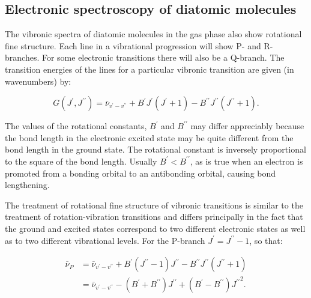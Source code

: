 \documentclass[
  9pt,
]{extbook}
\theoremstyle{definition}
\theoremstyle{definition}
\theoremstyle{definition}
\theoremstyle{remark}
\begin{document}
\hypertarget{electronic-spectroscopy-of-diatomic-molecules}{%
\subsection{Electronic spectroscopy of diatomic molecules}\label{electronic-spectroscopy-of-diatomic-molecules}}

The vibronic spectra of diatomic molecules in the gas phase also show rotational fine structure. Each line in a vibrational progression will show P- and R- branches. For some electronic transitions there will also be a Q-branch. The transition energies of the lines for a particular vibronic transition are given (in wavenumbers) by:

\begin{equation}
G(J^{\prime },J^{{\prime \prime }})={\bar  \nu }_{{v^{\prime }-v^{{\prime \prime }}}}+B^{\prime }J^{\prime }(J^{\prime }+1)-B^{{\prime \prime }}J^{{\prime \prime }}(J^{{\prime \prime }}+1).
\label{eq:elec1}
\end{equation}

The values of the rotational constants, \(B^{\prime}\) and \(B^{\prime\prime}\) may differ appreciably because the bond length in the electronic excited state may be quite different from the bond length in the ground state. The rotational constant is inversely proportional to the square of the bond length. Usually \(B^{\prime}<B^{\prime\prime}\), as is true when an electron is promoted from a bonding orbital to an antibonding orbital, causing bond lengthening.

The treatment of rotational fine structure of vibronic transitions is similar to the treatment of rotation-vibration transitions and differs principally in the fact that the ground and excited states correspond to two different electronic states as well as to two different vibrational levels. For the P-branch \(J^{\prime }=J^{{\prime \prime}}-1\), so that:

\begin{equation}
\begin{aligned}
{\bar  \nu }_{P}&={\bar  \nu}_{{v^{\prime}-v^{\prime\prime}}}+B^{\prime}(J^{\prime\prime}-1)J^{\prime\prime}-B^{\prime\prime}J^{\prime\prime}(J^{\prime\prime}+1) \\
&={\bar  \nu }_{{v^{\prime}-v^{\prime\prime}}}-(B^{\prime}+B^{\prime\prime})J^{\prime\prime}+(B^{\prime}-B^{\prime\prime}){J^{\prime\prime}}^{2}.
\end{aligned}
\label{eq:elec2}
\end{equation}
\end{document}
